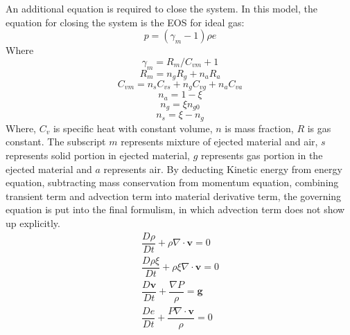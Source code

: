 \documentclass[10pt,a4paper]{article}
\begin{document}
An additional equation is required to close the system. In this model, the equation for closing the system is the EOS for ideal gas:
\begin{equation}
p = (\gamma_m - 1)\rho e \label{eq:EOS}
\end{equation}
Where 
\begin{equation}
\gamma_m = R_m/C_{vm} + 1 \label{eq:gov-gm}
\end{equation}
\begin{equation}
R_m = n_gR_g + n_aR_a  \label{eq:gov-Rm}
\end{equation}
\begin{equation}
C_{vm} = n_s C_{vs} + n_g C_{vg} + n_a C_{va} \label{eq:gov-Cvm}
\end{equation}
\begin{equation}
n_a = 1 - \xi \label{eq:gov-na}
\end{equation}
\begin{equation}
n_g = \xi n_{g0} \label{eq:gov-ng}
\end{equation}
\begin{equation}
n_s = \xi - n_g \label{eq:gov-ns}
\end{equation}
Where, $C_v$ is specific heat with constant volume, $n$ is mass fraction, $R$ is gas constant. The subscript 
$m$ represents mixture of ejected material and air, $s$ represents solid portion in ejected material, $g$ represents gas portion in the ejected material and $a$ represents air.
By deducting Kinetic energy from energy equation, subtracting mass conservation from momentum equation, combining transient term and advection term into material derivative term, the governing equation is put into the final formulism, in which advection term does not show up explicitly. 
\begin{eqnarray}
\dfrac{D \rho}{D t} + \rho \nabla \cdot \textbf{v} = 0 \label{eq:gov-nc-rho}\\
\dfrac{D \rho \xi}{D t} + \rho \xi \nabla \cdot \textbf{v} = 0 \label{eq:gov-nc-ks}\\
\dfrac{D \textbf{v}}{D t} + \dfrac{\nabla P}{\rho} =\textbf{g} \label{eq:gov-nc-v}\\
\dfrac{D e}{D t} + \dfrac{P \nabla \cdot \textbf{v}}{\rho} = 0 \label{eq:gov-nc-e}
\end{eqnarray}
\end{document}
